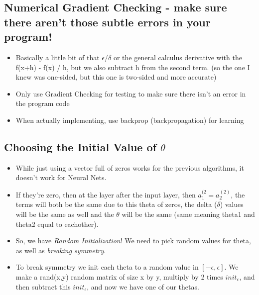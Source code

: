 \documentclass[]{article}
\begin{document}
	\subsection{Numerical Gradient Checking - make sure there aren't those subtle errors in your program!}
		\begin{itemize}
			\item Basically a little bit of that $\epsilon$/$\delta$ or the general calculus derivative with the f(x+h) - f(x) / h, but we also subtract h from the second term. (so the one I knew was one-sided, but this one is two-sided and more accurate)
			\item Only use Gradient Checking for testing to make sure there isn't an error in the program code
			\item When actually implementing, use backprop (backpropagation) for learning
		\end{itemize}

	\subsection{Choosing the Initial Value of $\theta$}
		\begin{itemize}
			\item While just using a vector full of zeros works for the previous algorithms, it doesn't work for Neural Nets.
			\item If they're zero, then at the layer after the input layer, then $a_1^{(2} = a_2^{(2)}$, the terms will both be the same due to this theta of zeros, the delta ($\delta$) values will be the same as well and the $\theta$ will be the same (same meaning theta1 and theta2 equal to eachother).
			\item So, we have \emph{Random Initialization}! We need to pick random values for theta, as well as \emph{breaking symmetry}. 
			\item To break symmetry we init each theta to a random value in $[-\epsilon,\epsilon]$. We make a rand(x,y) random matrix of size x by y, multiply by 2 times $init_\epsilon$, and then subtract this $init_\epsilon$, and now we have one of our thetas.
			
		\end{itemize}
		
\end{document}
